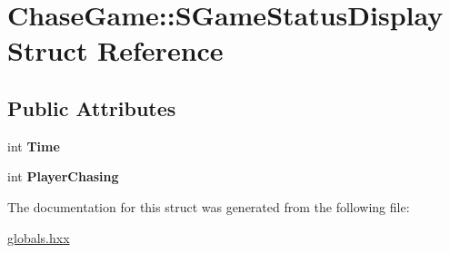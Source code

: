 \hypertarget{struct_chase_game_1_1_s_game_status_display}{\section{Chase\-Game\-:\-:S\-Game\-Status\-Display Struct Reference}
\label{struct_chase_game_1_1_s_game_status_display}
}
\subsection*{Public Attributes}
\begin{DoxyCompactItemize}
\item 
\hypertarget{struct_chase_game_1_1_s_game_status_display_a0d4720ed53664d255904b483a110a615}{int {\bfseries Time}}\label{struct_chase_game_1_1_s_game_status_display_a0d4720ed53664d255904b483a110a615}

\item 
\hypertarget{struct_chase_game_1_1_s_game_status_display_ad461a741bb745658f593f854e62bc742}{int {\bfseries Player\-Chasing}}\label{struct_chase_game_1_1_s_game_status_display_ad461a741bb745658f593f854e62bc742}

\end{DoxyCompactItemize}


The documentation for this struct was generated from the following file\-:\begin{DoxyCompactItemize}
\item 
\hyperlink{globals_8hxx}{globals.\-hxx}\end{DoxyCompactItemize}
